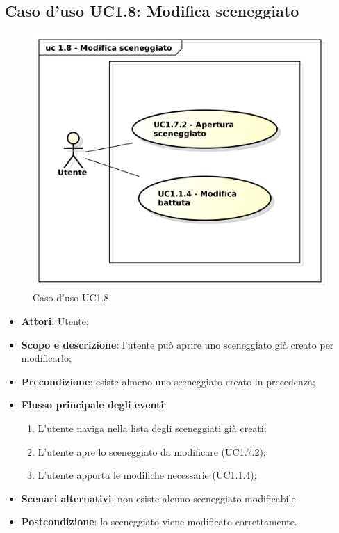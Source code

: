 \subsection{Caso d'uso UC1.8: Modifica sceneggiato}

\begin{figure}[htbp]
\centering
\includegraphics[scale=0.5]{UseCase_17_03_2016/immagini/uc_1_8_modifica_sceneggiato.png}
\captionsetup{labelfont=bf}
\caption{Caso d'uso UC1.8}
\end{figure}

\begin{itemize}
\item \textbf{Attori}: Utente;
\item \textbf{Scopo e descrizione}: l'utente può aprire uno sceneggiato già creato per modificarlo;
\item \textbf{Precondizione}: esiste almeno uno sceneggiato creato in precedenza;
\item \textbf{Flusso principale degli eventi}:
\begin{enumerate}
\item L'utente naviga nella lista degli sceneggiati già creati;
\item L'utente apre lo sceneggiato da modificare (UC1.7.2);
\item L'utente apporta le modifiche necessarie (UC1.1.4);
\end{enumerate}
\item \textbf{Scenari alternativi}: non esiste alcuno sceneggiato modificabile
\item \textbf{Postcondizione}: lo sceneggiato viene modificato correttamente.
\end{itemize}

